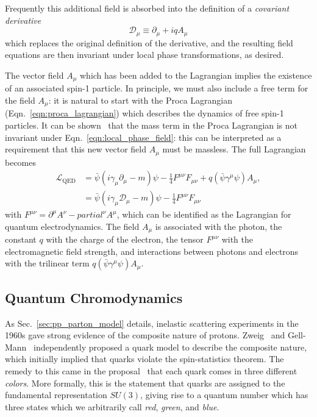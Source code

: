 Frequently this additional field is absorbed into the definition of a \emph{covariant derivative} 
\begin{equation}
    \mathcal D_\mu \equiv \partial_\mu + i q A_\mu
\end{equation}
which replaces the original definition of the derivative, and the resulting field equations are then invariant under local phase transformations, as desired.

The vector field $A_\mu$ which has been added to the Lagrangian implies the existence of an associated spin-1 particle.
In principle, we must also include a free term for the field $A_\mu$: it is natural to start with the Proca Lagrangian (Eqn.~\ref{eqn:proca_lagrangian}) which describes the dynamics of free spin-1 particles.
It can be shown~\cite{Griffiths:2008zz} that the mass term in the Proca Lagrangian is not invariant under Eqn.~\ref{eqn:local_phase_field}: this can be interpreted as a requirement that this new vector field $A_\mu$ must be massless.
The full Lagrangian becomes
\begin{align}
    \mathcal L_{\text{QED}} &= \bar{\psi}(i \gamma_\mu \partial_\mu - m) \psi - \frac{1}{4} F^{\mu\nu}F_{\mu\nu} + q (\bar{\psi}\gamma^\mu \psi)A_\mu, \\
                            &= \bar{\psi}(i \gamma_\mu \mathcal D_\mu - m)\psi - \frac{1}{4} F^{\mu\nu}F_{\mu\nu}
\end{align}
with $F^{\mu\nu} = \partial^\mu A^\nu - partial^\nu A^\mu$, which can be identified as the Lagrangian for quantum electrodynamics.
The field $A_\mu$ is associated with the photon, the constant $q$ with the charge of the electron, the tensor $F^{\mu\nu}$ with the electromagnetic field strength, and interactions between photons and electrons with the trilinear term $q (\bar{\psi}\gamma^\mu \psi)A_\mu$. 

\subsection{Quantum Chromodynamics} \label{sec:theory_qcd}
As Sec.~\ref{sec:pp_parton_model} details, inelastic scattering experiments in the 1960s gave strong evidence of the composite nature of protons.
Zweig~\cite{Zweig:1964jf} and Gell-Mann~\cite{GellMann:1964nj} independently proposed a quark model to describe the composite nature, which initially implied that quarks violate the spin-statistics theorem.
The remedy to this came in the proposal~\cite{Greenberg:1964pe} that each quark comes in three different \emph{colors}.
More formally, this is the statement that quarks are assigned to the fundamental representation $SU(3)$, giving rise to a quantum number which has three states which we arbitrarily call \emph{red}, \emph{green}, and \emph{blue}.

